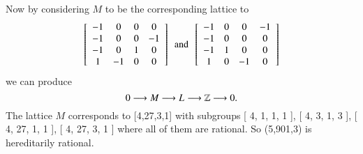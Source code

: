 Now by considering $M$ to be the corresponding lattice to 
$$
 \left[ \begin {array}{cccc} -1&0&0&0\\-1&0&0&-1
\\-1&0&1&0\\1&-1&0&0\end {array}
 \right] 
 \,\,\, \text{and} \,\,\,
 \left[ \begin {array}{cccc} -1&0&0&-1\\-1&0&0&0
\\-1&1&0&0\\1&0&-1&0\end {array}
 \right] 
$$
we can produce
$$
0 \longrightarrow M_{} \longrightarrow L_{} \longrightarrow \mathbb{Z} \longrightarrow 0
.$$
The lattice $M$ corresponds to [4,27,3,1] with subgroups [ 4, 1, 1, 1 ], [ 4, 3, 1, 3 ], [ 4, 27, 1, 1 ], [ 4, 27, 3, 1 ] where all of them are rational. So (5,901,3) is hereditarily rational.

